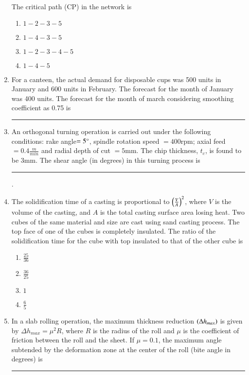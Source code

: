 \documentclass[journal]{IEEEtran}
\begin{document}
\begin{enumerate}
    The critical path (CP) in the network is
    
	\begin{multicols}{4}
		\begin{enumerate}
                \item $1-2-3-5$
                \item $1-4-3-5$
                \item $1-2-3-4-5$
                \item $1-4-5$
			\end{enumerate}
		\end{multicols}

    \item For a canteen, the actual demand for disposable cups was 500 units in January and 600 units in February. The forecast for the month of January was 400 units. The forecast for the month of march considering smoothing coefficient as 0.75 is \rule{1cm}{0.15mm}

    \item An orthogonal turning operation is carried out under the following conditions: rake angle$=5\degree$, spindle rotation speed $=400$rpm; axial feed $=0.4\frac{m}{min}$ and radial depth of cut $=5$mm. The chip thickness, $t_c$, is found to be 3mm. The shear angle (in degrees) in this turning process is \rule{1cm}{0.15mm}. 


    \item The solidification time of a casting is proportional to $\left(\frac{V}{A}\right)^2$, where $V$ is the volume of the casting, and $A$ is the total casting surface area losing heat. Two cubes of the same material and size are cast using sand casting process. The top face of one of the cubes is completely insulated. The ratio of the solidification time for the cube with top insulated to that of the other cube is

    \begin{multicols}{4}
        \begin{enumerate}
            \item $\frac{25}{36}$
            \item $\frac{36}{25}$
            \item $1$
            \item $\frac{6}{5}$
        \end{enumerate}
    \end{multicols}

    
    \item In a slab rolling operation, the maximum thickness reduction $\left(\Delta h_{max}\right)$ is given by $\Delta h_{max}=\mu^2R$, where $R$ is the radius of the roll and $\mu$ is the coefficient of friction between the roll and the sheet. If $\mu=0.1$, the maximum angle subtended by the deformation zone at the center of the roll (bite angle in degrees) is \rule{1cm}{0.15mm}


\end{enumerate}
\end{document}
